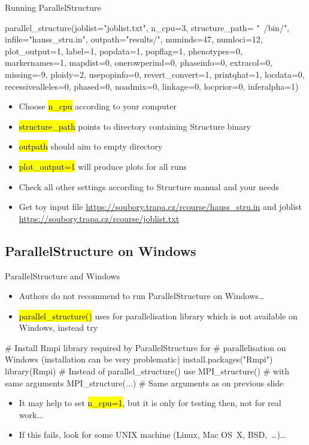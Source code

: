 \documentclass[compress, ucs, xelatex, 11pt, xcolor=svgnames,
  hyperref={
    bookmarks=true,
    unicode=true,
    colorlinks=true,
    pdftitle={Molecular data in R},
    plainpages=false,
    pdfauthor={Vojtech Zeisek},
    pdfsubject={Course about phylogeny and evolution in R},
    pdfcreator={XeLaTeX},
    pdfkeywords={R, evolution, phylogeny, molecular data},
    linkcolor=Tomato,
    anchorcolor=SaddleBrown,
    citecolor=Goldenrod,
    filecolor=DarkMagenta,
    menucolor=Sienna,
    urlcolor=DarkTurquoise,
    pdftex},
  url={hyphens, lowtilde} %
  ]{beamer}
\renewcommand{\texttt}[1]{\hl{\ttfamily #1}}
\begin{document}
\begin{frame}[fragile]{Running ParallelStructure}
  \begin{spluscode}
    parallel_structure(joblist="joblist.txt", n_cpu=3, structure_path=
      "~/bin/", infile="hauss_stru.in", outpath="results/", numinds=47,
      numloci=12, plot_output=1, label=1, popdata=1, popflag=1,
      phenotypes=0, markernames=1, mapdist=0, onerowperind=0, phaseinfo=0,
      extracol=0, missing=-9, ploidy=2, usepopinfo=0, revert_convert=1,
      printqhat=1, locdata=0, recessivealleles=0, phased=0, noadmix=0,
      linkage=0, locprior=0, inferalpha=1)
  \end{spluscode}
  \begin{itemize}
    \item Choose \texttt{n\_cpu} according to your computer
    \item \texttt{structure\_path} points to \alert{directory} containing Structure binary
    \item \texttt{outpath} should aim to \alert{empty} directory
    \item \texttt{plot\_output=1} will produce plots for all runs
    \item Check all other settings according to Structure manual and your needs
    \item Get toy input file \url{https://soubory.trapa.cz/rcourse/hauss_stru.in} and joblist \url{https://soubory.trapa.cz/rcourse/joblist.txt}
  \end{itemize}
\end{frame}

\subsection{ParallelStructure on Windows}

\begin{frame}[fragile]{ParallelStructure and Windows}
  \begin{itemize}
    \item Authors do not recommend to run ParallelStructure on Windows\ldots
    \item \texttt{parallel\_structure()} uses for parallelisation library which is not available on Windows, instead try
  \end{itemize}
  \begin{spluscode}
    # Install Rmpi library required by ParallelStructure for
    # parallelisation on Windows (installation can be very problematic)
    install.packages("Rmpi")
    library(Rmpi)
    # Instead of parallel_structure() use MPI_structure()
    # with same arguments
    MPI_structure(...) # Same arguments as on previous slide
  \end{spluscode}
  \begin{itemize}
    \item It may help to set \texttt{n\_cpu=1}, but it is only for testing then, not for real work...
    \item If this fails, look for some UNIX machine (Linux, Mac OS~X, BSD,~\ldots)\ldots
  \end{itemize}
\end{frame}
\end{document}
